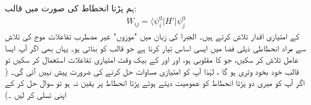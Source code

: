  ہم  پڑتا انحطاط کی صورت میں   قالب:
\begin{align}
W_{i j} = \langle \psi_i^0 | H' | \psi_j^0
\end{align}
کے امتیازی اقدار تلاش کرتے ہیں۔ الجبرا کی زبان میں "موزوں" غیر مضطرب تفاعلات موج کی تلاش سے مراد انحطاطی  ذيلی فضا میں ایسی اساس تیار کرنا ہے جو قالب  کو   بناتی ہو۔ یہاں بھی اگر آپ  ایسا عامل  تلاش کر  سکیں،  جو  کا  مقلوبی ہو، اور    اور  کے بیک وقت امتیازی تفاعلات استعمال کر سکیں تو  قالب  خود بخود  وتری ہو گا ، لہٰذا  آپ  کو امتیازی مساوات حل کرنے کی ضرورت پیش نہیں آئی گی۔  ( اگر آپ کو میری دو پڑتا انحطاط کو عمومیت دیتے ہوئے  پڑتا انحطاط پر یقین نہ ہو تو سوال  حل کر کے  اپنی تسلی کر لیں ۔)

